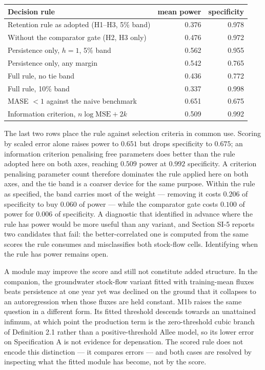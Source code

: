 \documentclass[11pt]{article}
\begin{document}
\begin{longtable}[]{@{}lrr@{}}
\toprule\noalign{}
Decision rule & mean power & specificity \\
\midrule\noalign{}
\endhead
\bottomrule\noalign{}
\endlastfoot
Retention rule as adopted (H1--H3, 5\% band) & 0.376 & 0.978 \\
Without the comparator gate (H2, H3 only) & 0.476 & 0.972 \\
Persistence only, \(h=1\), 5\% band & 0.562 & 0.955 \\
Persistence only, any margin & 0.542 & 0.765 \\
Full rule, no tie band & 0.436 & 0.772 \\
Full rule, 10\% band & 0.337 & 0.998 \\
MASE \(<1\) against the naive benchmark & 0.651 & 0.675 \\
Information criterion, \(n\log\mathrm{MSE}+2k\) & 0.509 & 0.992 \\
\end{longtable}

The last two rows place the rule against selection criteria in common
use. Scoring by scaled error alone raises power to \(0.651\) but drops
specificity to \(0.675\); an information criterion penalising free
parameters does better than the rule adopted here on both axes,
reaching \(0.509\) power at \(0.992\) specificity. A criterion penalising parameter count therefore dominates the rule
applied here on both axes, and the tie band is a coarser device for the
same purpose. Within the rule as specified, the band
carries most of the weight --- removing it costs \(0.206\) of
specificity to buy \(0.060\) of power --- while the comparator gate
costs \(0.100\) of power for \(0.006\) of specificity. A diagnostic that
identified in advance where the rule has power would be more useful
than any variant, and Section SI-5 reports two candidates that fail:
the better-correlated one is computed from the same scores the rule
consumes and misclassifies both stock-flow cells. Identifying when the
rule has power remains open.

A module may improve the score and still not constitute added
structure. In the companion, the
groundwater stock-flow variant fitted with training-mean fluxes beats
persistence at one year yet was declined on the ground that it collapses
to an autoregression when those fluxes are held constant. M1b raises the
same question in a different form. Its fitted threshold descends towards
an unattained infimum, at which point the production term is the
zero-threshold cubic branch of Definition 2.1 rather than a
positive-threshold Allee model, so its lower error on Specification A is
not evidence for depensation. The scored rule does not encode this
distinction --- it compares errors --- and both cases are resolved by
inspecting what the fitted module has become, not by the score.
\end{document}
